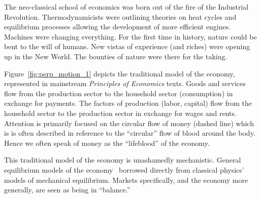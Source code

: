 The neo-classical school of economics 
was born out of the fire of the Industrial Revolution.
Thermodynamicists were outlining theories on 
heat cycles and equilibrium processes allowing
the development of more efficient engines.
Machines were changing everything.
For the first time in history,
nature could be bent to the will of humans.
New vistas of experience (and riches) were
opening up in the New World.
The bounties of nature were there for the taking.

Figure~\ref{fig:perp_motion_1} 
depicts the traditional model of the economy,
represented in mainstream \emph{Principles of Economics} texts.
Goods and services flow from the production sector
to the household sector (consumption)
in exchange for payments.
The factors of production (labor, capital)
flow from the household sector to the
production sector in exchange for wages and rents.
Attention is primarily focused on the circular flow
of money (dashed line) which is
is often described in reference to 
the ``circular'' flow of blood around the body.
Hence we often speak of money as the
``lifeblood'' of the economy.

This traditional model of the economy is unashamedly mechanistic.
General equilibrium models of the economy~\cite{Walras1892, Walras1993}
borrowed directly from classical physics' models of 
mechanical equilibrium.\cite{Ingrao1990}
Markets specifically,
and the economy more generally,
are seen as being in ``balance.''

